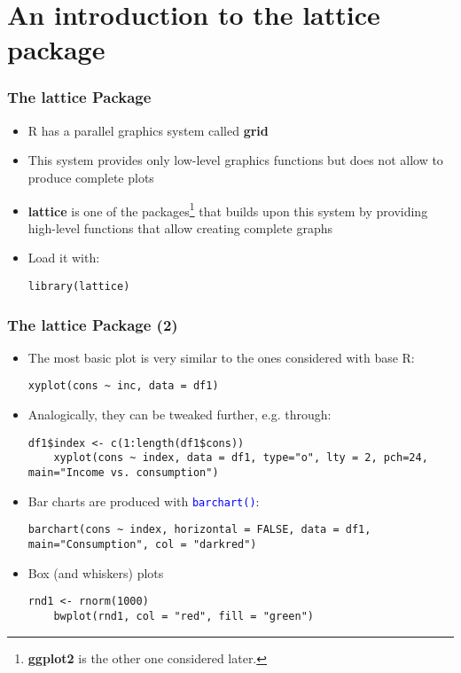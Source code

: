 \documentclass[10pt]{beamer}
\newcommand{\cc}[1]{\texttt{\textcolor{blue}{#1}}}
\theoremstyle{definition}
\begin{document}
\section{An introduction to the lattice package}
\begin{frame}[fragile]
\frametitle{The \textbf{lattice} Package}
\begin{itemize}
	\item R has a parallel graphics system called \textbf{grid}
	\item This system provides only low-level graphics functions but does not allow to produce complete plots
	\item \textbf{lattice} is one of the packages\footnote{\textbf{ggplot2} is the other one considered later.} that builds upon this system by providing high-level functions that allow creating complete graphs
	\item Load it with:
	\begin{lstlisting}[style = rstyle, breaklines]
	library(lattice)
	\end{lstlisting}
\end{itemize}
\end{frame}

\begin{frame}[fragile]
\frametitle{The \textbf{lattice} Package (2)}
\begin{itemize}
	\item The most basic plot is very similar to the ones considered with base R:
	\begin{lstlisting}[style = rstyle, breaklines]
	xyplot(cons ~ inc, data = df1)
	\end{lstlisting}
	\item Analogically, they can be tweaked further, e.g. through:
	\begin{lstlisting}[style = rstyle, breaklines]
	df1$index <- c(1:length(df1$cons))
	xyplot(cons ~ index, data = df1, type="o", lty = 2, pch=24, main="Income vs. consumption")
	\end{lstlisting}
	\item Bar charts are produced with \cc{barchart()}:
	\begin{lstlisting}[style = rstyle, breaklines]
	barchart(cons ~ index, horizontal = FALSE, data = df1, main="Consumption", col = "darkred")
	\end{lstlisting}
	\item Box (and whiskers) plots 
	\begin{lstlisting}[style = rstyle, breaklines]
	rnd1 <- rnorm(1000)
	bwplot(rnd1, col = "red", fill = "green")
	\end{lstlisting}
\end{itemize}
\end{frame}
\end{document}
